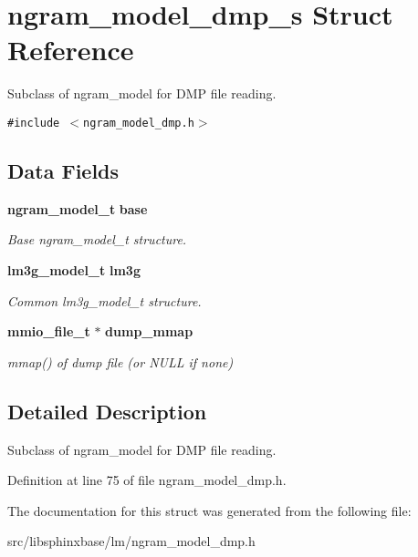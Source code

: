 \section{ngram\_\-model\_\-dmp\_\-s Struct Reference}
\label{structngram__model__dmp__s}
Subclass of ngram\_\-model for DMP file reading.  


{\tt \#include $<$ngram\_\-model\_\-dmp.h$>$}

\subsection*{Data Fields}
\begin{CompactItemize}
\item 
{\bf ngram\_\-model\_\-t} {\bf base}\label{structngram__model__dmp__s_fd4571dc9702255aed667b5de62e5332}

\begin{CompactList}\small\item\em Base ngram\_\-model\_\-t structure. \item\end{CompactList}\item 
{\bf lm3g\_\-model\_\-t} {\bf lm3g}\label{structngram__model__dmp__s_f889dddcba4b473e782f4a5a11ca47bd}

\begin{CompactList}\small\item\em Common lm3g\_\-model\_\-t structure. \item\end{CompactList}\item 
{\bf mmio\_\-file\_\-t} $\ast$ {\bf dump\_\-mmap}\label{structngram__model__dmp__s_e86e39a2c9e3078f0d9cffc6cf384702}

\begin{CompactList}\small\item\em mmap() of dump file (or NULL if none) \item\end{CompactList}\end{CompactItemize}


\subsection{Detailed Description}
Subclass of ngram\_\-model for DMP file reading. 

Definition at line 75 of file ngram\_\-model\_\-dmp.h.

The documentation for this struct was generated from the following file:\begin{CompactItemize}
\item 
src/libsphinxbase/lm/ngram\_\-model\_\-dmp.h\end{CompactItemize}
